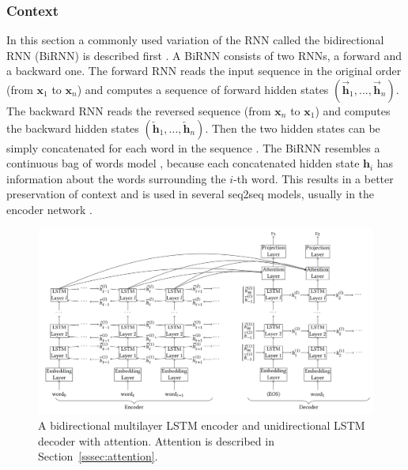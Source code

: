 \documentclass[12pt]{article}
\begin{document}
\subsubsection{Context} \label{sssec:context}
In this section a commonly used variation of the RNN called the bidirectional RNN (BiRNN) is described first \cite{Schuster:1997}. A BiRNN consists of two RNNs, a forward and a backward one. The forward RNN reads the input sequence in the original order (from \(\bm{x}_1\) to \(\bm{x}_n\)) and computes a sequence of forward hidden states \((\overrightarrow{\bm{h}}_1,...,\overrightarrow{\bm{h}}_n)\). The backward RNN reads the reversed sequence (from \(\bm{x}_n\) to \(\bm{x}_1\)) and computes the backward hidden states \((\overleftarrow{\bm{h}}_1,...,\overleftarrow{\bm{h}}_n)\). Then the two hidden states can be simply concatenated for each word in the sequence \cite{Bahdanau:2014,Zhaob:2017}. The BiRNN resembles a continuous bag of words model \cite{Mikolov:2013}, because each concatenated hidden state \(\bm{h}_i\) has information about the words surrounding the \(i\)-th word. This results in a better preservation of context and is used in several seq2seq models, usually in the encoder network \cite{Zhaob:2017,Xing_topic:2017,googleNMT:2016,Yin:2017}.
\begin{figure}[H]
	\centering
	\includegraphics[width=1.0\textwidth]{pics/bilstm.png}
	\caption{A bidirectional multilayer LSTM encoder and unidirectional LSTM decoder \cite{Yin:2017} with attention. Attention is described in Section~\ref{sssec:attention}.}
	\label{fig:context}
\end{figure}
\end{document}

